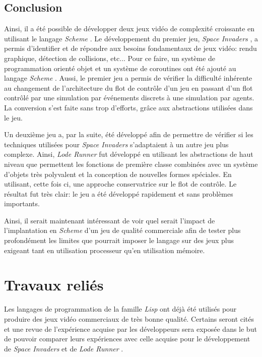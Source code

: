 \documentclass[12pt,twoside,letterpaper,francais]{book}
\newcommand{\lr}{{\textit{Lode Runner }}}
\newcommand{\si}{{\textit{Space Invaders }}}
\newcommand{\lisp}{{\textit{Lisp }}}
\newcommand{\Schemelang}{{\textit{Scheme }}}
\begin{document}
\FloatBarrier
\section{Conclusion}
Ainsi, il a été possible de développer deux jeux vidéo de complexité
croissante en utilisant le langage \Schemelang. Le développement du premier
jeu, \si, a permis d'identifier et de répondre aux besoins
fondamentaux de jeux vidéo: rendu graphique, détection de collisions,
etc... Pour ce faire, un système de programmation orienté objet et un
système de coroutines ont été ajouté au langage \Schemelang. Aussi, le
premier jeu a permis de vérifier la difficulté inhérente au changement
de l'architecture du flot de contrôle d'un jeu en passant d'un flot
contrôlé par une simulation par événements discrets à une simulation
par agents. La conversion s'est faite sans trop d'efforts, grâce aux
abstractions utilisées dans le jeu.

Un deuxième jeu a, par la suite, été développé afin de permettre de
vérifier si les techniques utilisées pour \si s'adaptaient à un autre
jeu plus complexe. Ainsi, \lr fut développé en utilisant les
abstractions de haut niveau que permettent les fonctions de première
classe combinées avec un système d'objets très polyvalent et la
conception de nouvelles formes spéciales. En utilisant, cette fois ci,
une approche conservatrice sur le flot de contrôle. Le résultat fut
très clair: le jeu a été développé rapidement et sans problèmes
importants.

Ainsi, il serait maintenant intéressant de voir quel serait l'impact
de l'implantation en \Schemelang d'un jeu de qualité commerciale afin de
tester plus profondément les limites que pourrait imposer le langage
sur des jeux plus exigeant tant en utilisation processeur qu'en
utilisation mémoire.





\clearpage

\chapter{Travaux reliés}
Les langages de programmation de la famille \lisp ont déjà été utilisés
pour produire des jeux vidéo commerciaux de très bonne
qualité. Certains seront cités et une revue de l'expérience acquise
par les développeurs sera exposée dans le but de pouvoir comparer
leurs expériences avec celle acquise pour le développement de \si et
de \lr.
\end{document}
